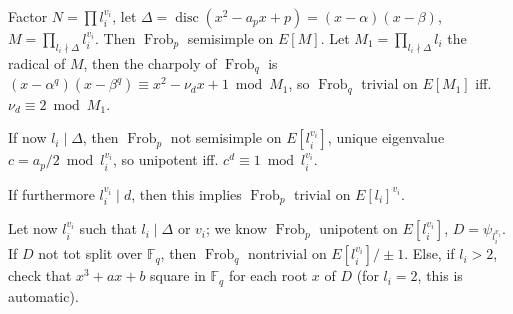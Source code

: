 \documentclass[12pt]{article}
\newcommand{\F}{\mathbb{F}}
\newcommand{\disc}{\operatorname{disc}}
\newcommand{\Frob}{\operatorname{Frob}}
\theoremstyle{definition}
\begin{document}
Factor $N = \prod l_i^{v_i}$, let $\Delta = \disc(x^2-a_p x+p)=(x-\alpha)(x-\beta)$, $M = \prod_{l_i \nmid \Delta} l_i^{v_i}$. Then $\Frob_p$ semisimple on $E[M]$. Let $M_1 = \prod_{l_i \nmid \Delta} l_i$ the radical of $M$, then the charpoly of $\Frob_q$ is $(x-\alpha^q)(x-\beta^q) \equiv x^2-\nu_d x + 1 \bmod M_1$, so $\Frob_q$ trivial on $E[M_1]$ iff. $\nu_d \equiv 2 \bmod M_1$.

If now $l_i \mid \Delta$, then $\Frob_p$ not semisimple on $E[l_i^{v_i}]$, unique eigenvalue $c = a_p/2 \bmod l_i^{v_i}$, so unipotent iff. $c^d \equiv 1 \bmod l_i^{v_i}$.

If furthermore $l_i^{v_i} \mid d$, then this implies $\Frob_p$ trivial on $E[l_i]^{v_i}$.

Let now $l_i^{v_i}$ such that $l_i \mid \Delta$ or $v_i$; we know $\Frob_p$ unipotent on $E[l_i^{v_i}]$, $D=\psi_{l_i^{v_i}}$. If $D$ not tot split over $\F_q$, then $\Frob_q$ nontrivial on $E[l_i^{v_i}]/\pm1$. Else, if $l_i > 2$, check that $x^3+ax+b$ square in $\F_q$ for each root $x$ of $D$ (for $l_i=2$, this is automatic). 
\end{document}
